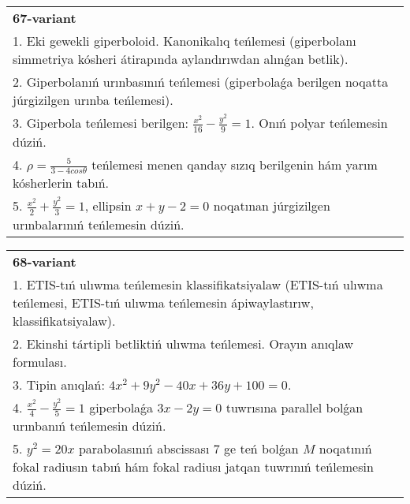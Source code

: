 \documentclass{article}
\begin{document}
\begin{tabular}{m{17cm}}
\textbf{67-variant}\\
1. Eki gewekli giperboloid. Kanonikalıq teńlemesi (giperbolanı simmetriya kósheri átirapında aylandırıwdan alınǵan betlik).\\

2. Giperbolanıń urınbasınıń teńlemesi (giperbolaǵa berilgen noqatta júrgizilgen urınba teńlemesi).\\

3. Giperbola teńlemesi berilgen: $\frac{x^{2}}{16}-\frac{y^{2}}{9}=1$. Onıń polyar teńlemesin dúziń.\\

4. $\rho = \frac{5}{3 - 4cos\theta}$ teńlemesi menen qanday sızıq berilgenin hám yarım kósherlerin tabıń.  \\

5. $\frac{x^{2}}{2} + \frac{y^{2}}{3} = 1$, ellipsin $x + y - 2 = 0$ noqatınan júrgizilgen urınbalarınıń teńlemesin dúziń.  
\end{tabular}
\vspace{1cm}


\begin{tabular}{m{17cm}}
\textbf{68-variant}\\
1. ETIS-tıń ulıwma teńlemesin klassifikatsiyalaw (ETIS-tıń ulıwma teńlemesi, ETIS-tıń ulıwma teńlemesin ápiwaylastırıw, klassifikatsiyalaw).\\

2. Ekinshi tártipli betliktiń ulıwma teńlemesi. Orayın anıqlaw formulası.\\

3. Tipin anıqlań: $4 x^2+9 y^2-40 x+36 y+100=0$.\\

4. $\frac{x^{2}}{4} - \frac{y^{2}}{5} = 1$ giperbolaǵa $3x - 2y = 0$ tuwrısına parallel bolǵan urınbanıń teńlemesin dúziń.  \\

5. $y^{2} = 20x$ parabolasınıń abscissası 7 ge teń bolǵan $M$ noqatınıń fokal radiusın tabıń hám fokal radiusı jatqan tuwrınıń teńlemesin dúziń.  
\end{tabular}
\vspace{1cm}
\end{document}
